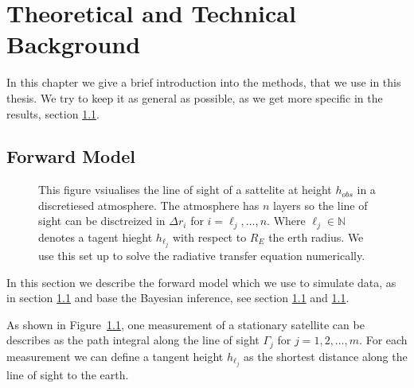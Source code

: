\chapter{Theoretical and Technical Background}

In this chapter we give a brief introduction into the methods, that we use in this thesis.
We try to keep it as general as possible, as we get more specific in the results, section \ref{}.

\section{Forward Model}

\begin{figure}[ht!]
	\centering
	\scalebox{0.9}{}
	\caption{This figure vsiualises the line of sight of a sattelite at height $h_{obs}$ in a discretiesed atmosphere. The atmosphere has $n$ layers so the line of sight can be disctreized in $\Delta r_i$ for $i = \ell_j , \dots, n$.
	Where $\ell_j \in \mathbb{N}$ denotes a tagent hieght $h_{\ell_j}$  with respect to $R_E$ the erth radius. We use this set up to solve the radiative transfer equation numerically.}
	\label{fig:FirstLIMB}
\end{figure}

In this section we describe the forward model which we use to simulate data, as in section \ref{} and base the Bayesian inference, see section \ref{} and \ref{}.


As shown in Figure~\ref{fig:FirstLIMB}, one measurement of a stationary satellite can be describes as the path integral along the line of sight $\Gamma_j$ for $j=1,2,\ldots,m$.
For each measurement we can define a tangent height $h_{\ell_j}$ as the shortest distance along the line of sight to the earth.

